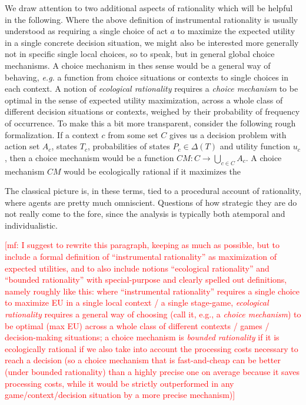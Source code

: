 \documentclass[a4paper]{article}
\newcommand{\mf}[1]{\textcolor{Red}{[mf: #1]}}
\begin{document}
We draw attention to two additional aspects of rationality which will be helpful in the following.
Where the above definition of instrumental rationality is usually understood as requiring a single choice of act $a$ to maximize the expected utility in a single concrete decision situation, we might also be interested more generally not in specific single local choices, so to speak, but in general global choice mechanisms.
A choice mechanism in thes sense would be a general way of behaving, \emph{e.g.} a function from choice situations or contexts to single choices in each context.
A notion of \emph{ecological rationality} requires a \emph{choice mechanism} to be optimal in the sense of expected utility maximization, across a whole class of different decision situations or contexts, weighed by their probability of frequency of occurrence.
To make this a bit more transparent, consider the following rough formalization.
If a context $c$ from some set $C$ gives us a decision problem with action set $A_c$, states $T_c$, probabilities of states $P_c \in \Delta(T)$ and utility function $u_c$, then a choice mechanism would be a function $CM \colon C \rightarrow \bigcup_{c \in C} A_c$. A choice mechanism $CM$ would be ecologically rational if it maximizes the 

The classical picture is, in these terms, tied to a procedural account of rationality, where agents are pretty much omniscient.
Questions of how strategic they are do not really come to the fore, since the analysis is typically both atemporal and individualistic.

\mf{I suggest to rewrite this paragraph, keeping as much as possible, but to include a formal definition of ``instrumental rationality'' as maximization of expected utilities, and to also include notions ``ecological rationality'' and ``bounded rationality'' with special-purpose and clearly spelled out definitions, namely roughly like this: where ``instrumental rationality'' requires a single choice to maximize EU in a single local context / a single stage-game, \emph{ecological rationality} requires a general way of choosing (call it, e.g., a \emph{choice mechanism}) to be optimal (max EU) across a whole class of different contexts / games / decision-making situations; a choice mechanism is \emph{bounded rationality} if it is ecologically rational if we also take into account the processing costs necessary to reach a decision (so a choice mechanism that is fast-and-cheap can be better (under bounded rationality) than a highly precise one on average because it saves processing costs, while it would be strictly outperformed in any game/context/decision situation by a more precise mechanism)}
\end{document}
